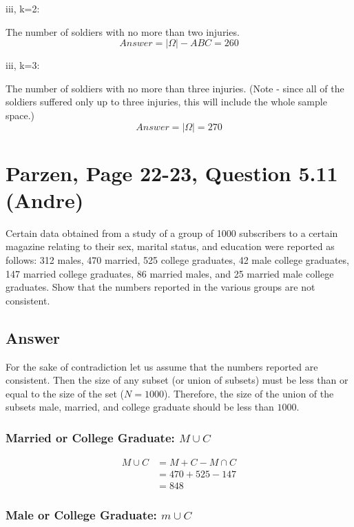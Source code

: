\documentclass[11pt]{article}
\begin{document}
\vspace{1em}


iii, k=2:

The number of soldiers with no more than two injuries.
\[
Answer = \left|\Omega\right| - ABC = 260
\]

\vspace{1em}


iii, k=3:

The number of soldiers with no more than three injuries.
(Note - since all of the soldiers suffered only up to three injuries, this will include the whole sample space.)
\[
Answer = \left|\Omega\right| = 270
\]



\section*{Parzen, Page 22-23, Question 5.11 (Andre)}

Certain data obtained from a study of a group of 1000 subscribers to a certain magazine relating to their sex, marital status, and education were reported as follows:
312 males, 470 married, 525 college graduates, 42 male college graduates, 147 married college graduates, 86 married males, and 25 married male college graduates.
Show that the numbers reported in the various groups are not consistent.

\subsection*{Answer}

For the sake of contradiction let us assume that the numbers reported are consistent. Then the size of any subset (or union of subsets) must be less than or equal to the size of the set ($N = 1000$). Therefore, the size of the union of the subsets male, married, and college graduate should be less than $1000$.


\subsubsection*{Married or College Graduate: $M\cup C$}

\begin{align*}
    M \cup C &= M + C - M\cap C\\
    &= 470 + 525 -147\\
    &= 848
\end{align*}

\subsubsection*{Male or College Graduate: $m\cup C$}
\end{document}
